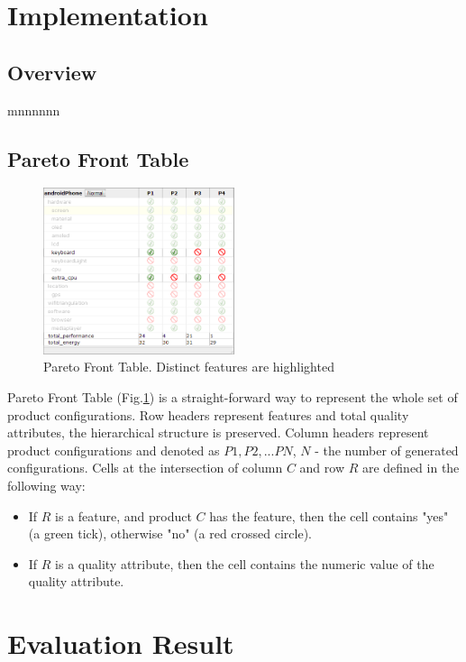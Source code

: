 \documentclass{acm_proc_article-sp}
\begin{document}
\section{Implementation}

\subsection{Overview}

mnnnnnn  

\subsection{Pareto Front Table}

\begin{figure}[h]
\includegraphics[width=0.5\textwidth]{table.png}
\caption{Pareto Front Table. Distinct features are highlighted}    
  \label{fig:table}
\end{figure}

Pareto Front Table (Fig.\ref{fig:table}) is a straight-forward way to represent the whole set of product configurations. Row headers represent features and total quality attributes, the hierarchical structure is preserved. Column headers represent product configurations and denoted as $P1, P2, ... PN$, $N$ - the number of generated configurations. Cells at the intersection of column $C$ and row $R$ are defined in the following way:
\begin{itemize}
\item If $R$ is a feature, and product $C$ has the feature, then the cell contains "yes" (a green tick), otherwise "no" (a red crossed circle).
\item If $R$ is a quality attribute, then the cell contains the numeric value of the quality attribute.
\end{itemize}


\section{Evaluation Result}
\end{document}
